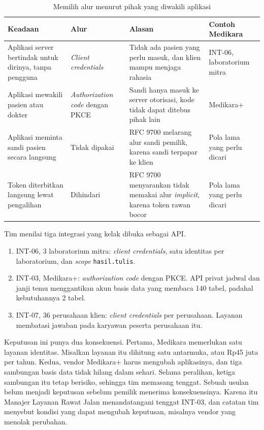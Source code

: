 \begin{table}[!htb]
  \centering
  \caption{Memilih alur menurut pihak yang diwakili aplikasi}
  \label{tab:ch06-alur}
  \small
  \begin{tabularx}{\textwidth}{QT{3.0cm}QT{2.2cm}}
    \hline
    \textbf{Keadaan} & \textbf{Alur} & \textbf{Alasan} & \textbf{Contoh Medikara} \\ \hline
    Aplikasi server bertindak untuk dirinya, tanpa pengguna & \textit{Client credentials} & Tidak ada pasien yang perlu masuk, dan klien mampu menjaga rahasia & INT-06, laboratorium mitra \\ \hline
    Aplikasi mewakili pasien atau dokter & \textit{Authorization code} dengan PKCE & Sandi hanya masuk ke server otorisasi, kode tidak dapat ditebus pihak lain & Medikara+ \\ \hline
    Aplikasi meminta sandi pasien secara langsung & Tidak dipakai & RFC 9700 melarang alur sandi pemilik, karena sandi terpapar ke klien & Pola lama yang perlu dicari \\ \hline
    Token diterbitkan langsung lewat pengalihan & Dihindari & RFC 9700 menyarankan tidak memakai alur \textit{implicit}, karena token rawan bocor & Pola lama yang perlu dicari \\ \hline
  \end{tabularx}
\end{table}

\begin{kasus}[title={Kasus Medikara Health: Memilih Alur untuk Tiga Integrasi}]
Tim menilai tiga integrasi yang kelak dibuka sebagai API.
\begin{enumerate}
  \item INT-06, 3 laboratorium mitra: \textit{client credentials}, satu identitas per laboratorium, dan \textit{scope}
        \texttt{hasil.tulis}.
  \item INT-03, Medikara+: \textit{authorization code} dengan PKCE. API privat jadwal dan janji temu menggantikan akun
        basis data yang membaca 140 tabel, padahal kebutuhannya 2 tabel.
  \item INT-07, 36 perusahaan klien: \textit{client credentials} per perusahaan. Layanan membatasi jawaban pada karyawan
        peserta perusahaan itu.
\end{enumerate}

Keputusan ini punya dua konsekuensi. Pertama, Medikara memerlukan satu layanan identitas. Misalkan layanan itu dihitung
satu antarmuka, atau Rp45 juta per tahun. Kedua, vendor Medikara+ harus mengubah aplikasinya, dan tiga sambungan basis
data tidak hilang dalam sehari. Selama peralihan, ketiga sambungan itu tetap berisiko, sehingga tim memasang tenggat.
Sebuah usulan belum menjadi keputusan sebelum pemilik menerima konsekuensinya. Karena itu Manajer Layanan Rawat Jalan
menandatangani tenggat INT-03, dan catatan tim menyebut kondisi yang dapat mengubah keputusan, misalnya vendor yang menolak
perubahan.
\end{kasus}

